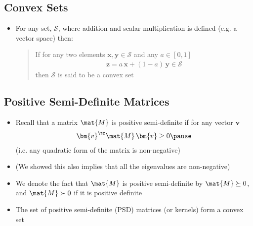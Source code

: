 
\begin{slide}
\section{Convex Sets}

\begin{PauseHighLight}
  \begin{itemize}
  \item For any set, $\mathcal{S}$, where addition and scalar
    multiplication is defined (e.g. a vector space) then:
    \begin{quotation}
      \noindent If for any two elements $\bm{x},\bm{y} \in \mathcal{S}$ and any
      $a\in[0,1]$
      \begin{align*}
        \bm{z} = a\,\bm{x} + (1-a)\,\bm{y} \in \mathcal{S}
      \end{align*}
      then $\mathcal{S}$ is said to be a convex set\pause
    \end{quotation}
  \end{itemize}
\end{PauseHighLight}

\end{slide}


\begin{slide}
\section[-2]{Positive Semi-Definite Matrices}

\begin{PauseHighLight}
  \begin{itemize}
  \item Recall that a matrix $\mat{M}$ is positive semi-definite if for any
    vector $\bm{v}$
    \begin{align*}
      \bm{v}^\tr \mat{M}\,\bm{v} \geq 0\pause
    \end{align*}
    (i.e.{} any quadratic form of the matrix is non-negative)\pauseb
  \item (We showed this also implies that all the eigenvalues are
    non-negative)\pause
  \item We denote the fact that $\mat{M}$ is positive semi-definite by
    $\mat{M}\succeq0$, and $\mat{M} \succ 0$ if it is positive definite\pause
  \item The set of positive semi-definite (PSD) matrices (or kernels) form a
    convex set\pause
  \end{itemize}
\end{PauseHighLight}


\end{slide}

